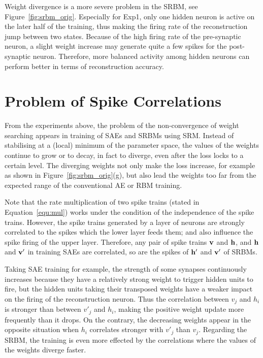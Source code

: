 Weight divergence is a more severe problem in the SRBM, see Figure~\ref{fig:srbm_orig}.
Especially for Exp1, only one hidden neuron is active on the later half of the training, thus making the firing rate of the reconstruction jump between two states.
Because of the high firing rate of the pre-synaptic neuron, a slight weight increase may generate quite a few spikes for the post-synaptic neuron.
Therefore, more balanced activity among hidden neurons can perform better in terms of reconstruction accuracy.

\section{Problem of Spike Correlations}
\label{sec:problem}
From the experiments above, the problem of the non-convergence of weight searching appears in training of SAEs and SRBMs using SRM.
Instead of stabilising at a (local) minimum of the parameter space, the values of the weights continue to grow or to decay, in fact to diverge, even after the loss locks to a certain level.
The diverging weights \DIFaddbegin {}\DIFaddend not only make the loss increase, for example as shown in Figure~\ref{fig:srbm_orig}(g), but also lead the weights too far from the expected \DIFdelbegin {}\DIFdelend range of the conventional AE or RBM training\DIFaddbegin {}\DIFaddend .


\DIFdelbegin {}\DIFdelend Note that the rate multiplication of two spike trains (stated in Equation~\ref{equ:mul}) works under the condition of the independence of the spike trains.
However, the spike trains generated by a layer of neurons are strongly correlated to the spikes which the lower layer feeds them; and also influence the spike firing of the upper layer.
Therefore, any pair of spike trains $\bf{v}$ and $\bf{h}$, and $\bf{h}$ and $\bf{v'}$ in training SAEs are correlated, so are the spikes of $\bf{h'}$ and $\bf{v'}$ of SRBMs.
\DIFaddbegin {}\DIFaddend 


Taking SAE training for example, the strength of some synapses continuously increases because they have a relatively strong weight to trigger hidden units to fire, but the hidden units taking their transposed weights have a weaker impact on the firing of the reconstruction neuron.
Thus the correlation between $v_j$ and $h_i$ is stronger than between $v'_j$ and $h_i$, making the positive weight update more frequently than it drops.
On the contrary, the decreasing weights appear in the opposite situation when $h_i$ correlates stronger with $v'_j$ than $v_j$.
Regarding the SRBM, the training is even more effected by the correlations where the values of the weights diverge faster.

